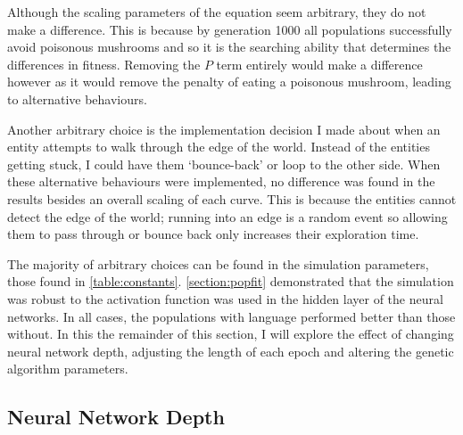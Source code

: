 \documentclass[12pt,a4paper]{report}
\begin{document}
Although the scaling parameters of the equation seem arbitrary, they do not make a difference. This is because by generation 1000 all populations successfully avoid poisonous mushrooms and so it is the searching ability that determines the differences in fitness. Removing the $P$ term entirely would make a difference however as it would remove the penalty of eating a poisonous mushroom, leading to alternative behaviours.

Another arbitrary choice is the implementation decision I made about when an entity attempts to walk through the edge of the world. Instead of the entities getting stuck, I could have them `bounce-back' or loop to the other side. When these alternative behaviours were implemented, no difference was found in the results besides an overall scaling of each curve. This is because the entities cannot detect the edge of the world; running into an edge is a random event so allowing them to pass through or bounce back only increases their exploration time.

The majority of arbitrary choices can be found in the simulation parameters, those found in \cref{table:constants}. \cref{section:popfit} demonstrated that the simulation was robust to the activation function was used in the hidden layer of the neural networks. In all cases, the populations with language performed better than those without. In this the remainder of this section, I will explore the effect of changing neural network depth, adjusting the length of each epoch and altering the genetic algorithm parameters.

\subsection{Neural Network Depth}
\end{document}
